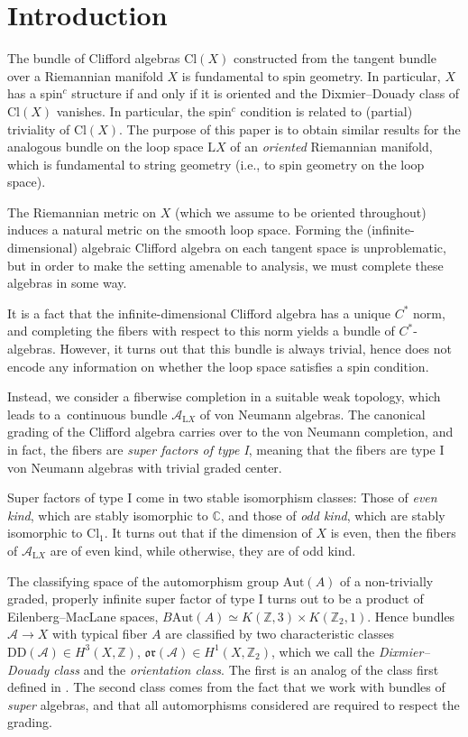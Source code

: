 \documentclass[11pt]{article}
\numberwithin{equation}{section}
\numberwithin{equation}{section}
\newcommand{\Z}{\mathbb{Z}}
\newcommand{\C}{\mathbb{C}}
\newcommand{\Cl}{\mathrm{Cl}}
\newcommand{\Aut}{\mathrm{Aut}}
\renewcommand{\L}{\mathrm{L}}
\newcommand{\DD}{\mathrm{DD}}
\newcommand{\oclass}{\mathfrak{or}}
\begin{document}
\section{Introduction}

The bundle of Clifford algebras $\Cl(X)$ constructed from the tangent bundle over a Riemannian manifold $X$ is fundamental to spin geometry.
In particular, $X$ has a spin$^c$ structure if and only if it is oriented and the Dixmier--Douady class of $\Cl(X)$ vanishes.
In particular, the spin$^c$ condition is related to (partial) triviality of $\Cl(X)$.
The purpose of this paper is to obtain similar results for the analogous bundle on the loop space $\L X$ of an \emph{oriented} Riemannian manifold, which is fundamental to string geometry (i.e., to spin geometry on the loop space).

The Riemannian metric on $X$ (which we assume to be oriented throughout) induces a natural metric on the smooth loop space.
Forming the (infinite-dimensional) algebraic Clifford algebra on each tangent space is unproblematic, but in order to make the setting amenable to analysis, we must complete these algebras in some way.

It is a fact that the infinite-dimensional Clifford algebra has a unique $C^*$ norm, and completing the fibers with respect to this norm yields a bundle of $C^*$-algebras.
However, it turns out that this bundle is always trivial, hence does not encode any information on whether the loop space satisfies a spin condition.

Instead, we consider a fiberwise completion in a suitable weak topology, which leads to a~continuous bundle $\mathcal{A}_{\L X}$ of von Neumann algebras.
The canonical grading of the Clifford algebra carries over to the von Neumann completion, and in fact, the fibers are \emph{super factors of type I}, meaning that the fibers are type I von Neumann algebras with trivial graded center.

Super factors of type I come in two stable isomorphism classes:
Those of \emph{even kind}, which are stably isomorphic to $\C$, and those of \emph{odd kind}, which are stably isomorphic to $\Cl_1$.
It turns out that if the dimension of $X$ is even, then the fibers of $\mathcal{A}_{\L X}$ are of even kind, while otherwise, they are of odd kind.

The classifying space of the automorphism group $\Aut(A)$ of a non-trivially graded, properly infinite super factor of type I turns out to be a product of Eilenberg--MacLane spaces, $B\Aut(A) \simeq K(\Z, 3) \times K(\Z_2, 1)$.
Hence bundles $\mathcal{A} \to X$ with typical fiber $A$ are classified by two characteristic classes
$
\DD(\mathcal{A}) \in H^3(X, \Z)$, $\oclass(\mathcal{A}) \in H^1(X, \Z_2)$,
which we call the \emph{Dixmier--Douady class} and the \emph{orientation class}.
The first is an analog of the class first defined in \cite{DixmierDouady}.
The second class comes from the fact that we work with bundles of \emph{super} algebras, and that all automorphisms considered are required to respect the grading.
\end{document}
